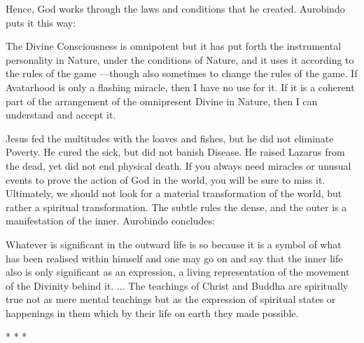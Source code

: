 Hence, God works through the laws and conditions that he created. Aurobindo puts it this way:

\begin{quotex}
The Divine Consciousness is omnipotent but it has put forth the instrumental personality in Nature, under the conditions of Nature, and it uses it according to the rules of the game ---though also sometimes to change the rules of the game. If Avatarhood is only a flashing miracle, then I have no use for it. If it is a coherent part of the arrangement of the omnipresent Divine in Nature, then I can understand and accept it.
\end{quotex}


Jesus fed the multitudes with the loaves and fishes, but he did not eliminate Poverty. He cured the sick, but did not banish Disease. He raised Lazarus from the dead, yet did not end physical death. If you always need miracles or unusual events to prove the action of God in the world, you will be sure to miss it. Ultimately, we should not look for a material transformation of the world, but rather a spiritual transformation. The subtle rules the dense, and the outer is a manifestation of the inner. Aurobindo concludes:

\begin{quotex}
Whatever is significant in the outward life is so because it is a symbol of what has been realised within himself and one may go on and say that the inner life also is only significant as an expression, a living representation of the movement of the Divinity behind it. ... The teachings of Christ and Buddha are spiritually true not as mere mental teachings but as the expression of spiritual states or happenings in them which by their life on earth they made possible.
\end{quotex}




\begin{center}* * *\end{center}

